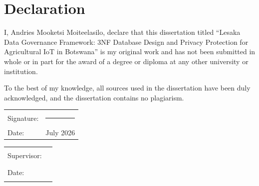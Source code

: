 
\chapter*{Declaration}

I, Andries Mooketsi Moiteelasilo, declare that this dissertation titled ``Lesaka Data Governance Framework: 3NF Database Design and Privacy Protection for Agricultural IoT in Botswana'' is my original work and has not been submitted in whole or in part for the award of a degree or diploma at any other university or institution.

To the best of my knowledge, all sources used in the dissertation have been duly acknowledged, and the dissertation contains no plagiarism.

\vspace{2cm}

\begin{tabular}{@{}p{}@{}p{}}
Signature: & \rule{6cm}{0.5pt} \\
Date: & July 2026 \\
\end{tabular}

\vspace{2cm}

\begin{tabular}{@{}p{}@{}p{}}
Supervisor: & \rule{6cm}{0.5pt} \\
Date: & \rule{6cm}{0.5pt} \\
\end{tabular}
